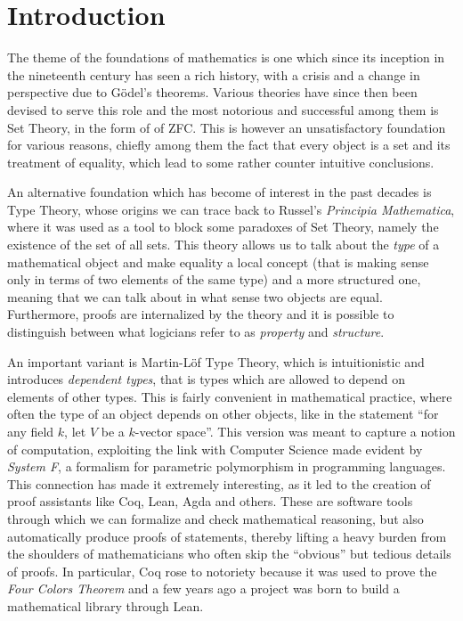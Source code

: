 \chapter*{Introduction}

The theme of the foundations of mathematics is one which since its inception in
the nineteenth century has seen a rich history, with a crisis and a change in
perspective due to G{\"o}del's theorems. Various theories have since then been
devised to serve this role and the most notorious and successful among them is
Set Theory, in the form of of ZFC. This is however an unsatisfactory foundation
for various reasons, chiefly among them the fact that every object is a set and
its treatment of equality, which lead to some rather counter intuitive
conclusions.

\noindent
An alternative foundation which has become of interest in the past decades is
Type Theory, whose origins we can trace back to Russel's \emph{Principia
Mathematica}, where it was used as a tool to block some paradoxes of Set Theory,
namely the existence of the set of all sets. This theory allows us to talk about
the \emph{type} of a mathematical
object and make equality a local concept (that is making sense only in terms of
two elements of the same type) and a more structured one, meaning that we can
talk about in what sense two objects are equal. Furthermore, proofs are
internalized by the theory and it is possible to distinguish between what
logicians refer to as \emph{property} and \emph{structure}.

\noindent
An important variant is Martin-L{\"o}f Type Theory, which is
intuitionistic and introduces \emph{dependent types}, that is types which are
allowed to depend on elements of other types. This is fairly convenient in
mathematical practice, where often the type of an object depends on other
objects, like in the statement ``for any field
$k$, let $V$ be a $k$-vector space''. This version was meant
to capture a notion of computation, exploiting the link with Computer Science
made evident by \emph{System F}, a formalism for parametric polymorphism in
programming languages. This connection
has made it extremely interesting, as it led to the
creation of proof assistants like Coq, Lean, Agda and others. These are software
tools through which we can formalize and check mathematical reasoning, but also
automatically produce proofs of statements, thereby lifting a heavy burden from
the shoulders of mathematicians who often skip the ``obvious'' but tedious
details of proofs. In particular, Coq rose to notoriety because it was used to
prove the \emph{Four Colors Theorem} and a few years ago a project was born to
build a mathematical library through Lean.

